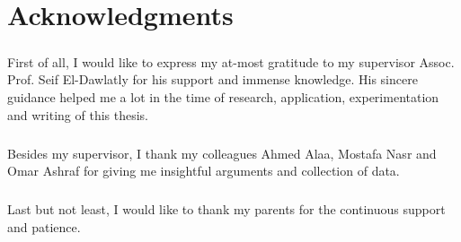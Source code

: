 \chapter*{Acknowledgments}
\label{chap:ack}

\paragraph{}
First of all, I would like to express my at-most gratitude to my supervisor Assoc. Prof. Seif El-Dawlatly for his support and immense knowledge. His sincere guidance helped me a lot in the time of research, application, experimentation and writing of this thesis.

\paragraph{}
Besides my supervisor, I thank my colleagues Ahmed Alaa, Mostafa Nasr and Omar Ashraf for giving me insightful arguments and collection of data.

\paragraph{}
Last but not least, I would like to thank my parents for the continuous support and patience.